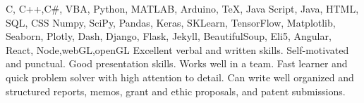 %
%
%



\begin{keywords}
					{C, C++,C\#, VBA, Python, MATLAB, Arduino, TeX, Java Script, Java, HTML, SQL, CSS}
					{Numpy, SciPy, Pandas, Keras, SKLearn, TensorFlow, Matplotlib, Seaborn, Plotly, Dash, Django, Flask, Jekyll, BeautifulSoup,  Eli5, Angular, React, Node,webGL,openGL}
					{Excellent verbal and written skills. Self-motivated and punctual. Good presentation skills. Works well in a team. Fast learner and quick problem solver with high attention to detail.}
					{Can write well organized and structured reports, memos, grant and ethic proposals, and patent submissions.}
\end{keywords}